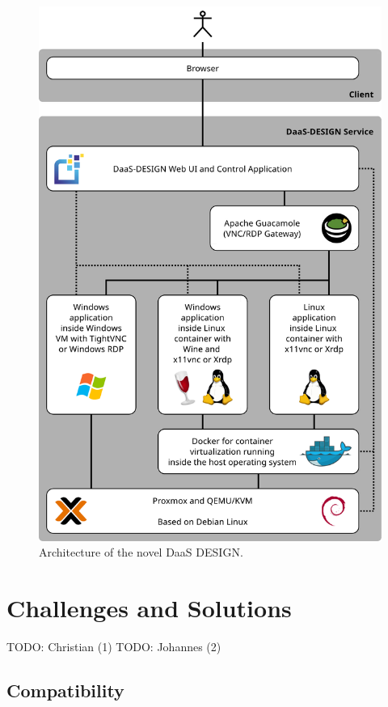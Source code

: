 \documentclass[runningheads]{llncs}
\begin{document}
\begin{figure}
\includegraphics[width=\textwidth]{images/DaaS_DESIGN_Architecture_v11_english.pdf}
\caption{Architecture of the novel DaaS DESIGN.} \label{figure_architecture}
\end{figure}

\section{Challenges and Solutions}
\label{sec:AnalysisPossibleComponents}

TODO: Christian (1)
TODO: Johannes (2)

\subsection{Compatibility}
\end{document}

